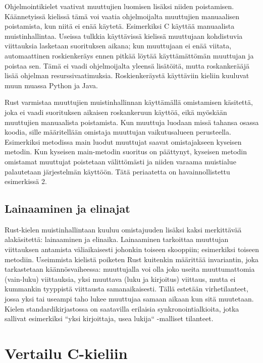 \documentclass[finnish]{tktltiki2}
\theoremstyle{definition}
\theoremstyle{remark}
\begin{document}
Ohjelmointikielet vaativat muuttujien luomisen lisäksi niiden poistamisen. Käännetyissä kielissä tämä voi vaatia ohjelmoijalta muuttujien manuaalisen poistamista, kun niitä ei enää käytetä. Esimerkiksi C käyttää manuaalista muistinhallintaa. Useissa tulkkia käyttävissä kielissä muuttujaan kohdistuvia viittauksia lasketaan suorituksen aikana; kun muuttujaan ei enää viitata, automaattinen roskienkeräys ennen pitkää löytää käyttämättömän muuttujan ja poistaa sen. Tämä ei vaadi ohjelmoijalta yleensä lisätöitä, mutta roskankerääjä lisää ohjelman resurssivaatimuksia. Roskienkeräystä käyttäviin kieliin kuuluvat muun muassa Python ja Java.

Rust varmistaa muuttujien muistinhallinnan käyttämällä omistamisen käsitettä, joka ei vaadi suorituksen aikaisen roskankeruun käyttöä, eikä myöskään muuttujien manuaalista poistamista. Kun muuttuja luodaan missä tahansa osassa koodia, sille määritellään omistaja muuttujan vaikutusalueen perusteella. Esimerkiksi metodissa main luodut muuttujat saavat omistajakseen kyseisen metodin. Kun kyseisen main-metodin suoritus on päättynyt, kyseisen metodin omistamat muuttujat poistetaan välittömästi ja niiden varaama muistialue palautetaan järjestelmän käyttöön. Tätä periaatetta on havainnollistettu esimerkissä 2. %

\subsection{Lainaaminen ja elinajat}

Rust-kielen muistinhallintaan kuuluu omistajuuden lisäksi kaksi merkittävää alakäsitettä: lainaaminen ja elinaika. Lainaaminen tarkoittaa muuttujan viittauksen antamista väliaikaisesti johonkin toiseen skooppiin; esimerkiksi toiseen metodiin. Useimmista kielistä poiketen Rust kuitenkin määrittää invariantin, joka tarkastetaan käännösvaiheessa: muuttujalla voi olla joko useita muuttumattomia (vain-luku) viittauksia, yksi muuttava (luku ja kirjoitus) viittaus, mutta ei kummankin tyyppistä viittausta samanaikaisesti. Tällä estetään virhetilanteet, jossa yksi tai useampi taho lukee muuttujaa samaan aikaan kun sitä muutetaan. Kielen standardikirjastossa on saatavilla erilaisia synkronointialkioita, jotka sallivat esimerkiksi ``yksi kirjoittaja, usea lukija`` -malliset tilanteet.

\section{Vertailu C-kieliin}
\end{document}
